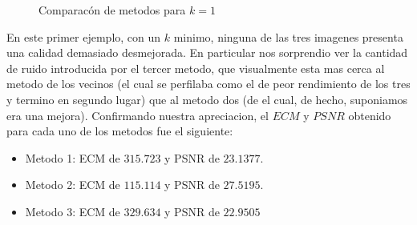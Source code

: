 \begin{figure}[H]
    \centering
    \qquad
    \qquad
    \caption{Comparacón de metodos para $k = 1$}
    \label{fig:example}
\end{figure}

En este primer ejemplo, con un $k$ minimo, ninguna de las tres imagenes presenta una calidad demasiado desmejorada. En particular nos sorprendio ver la cantidad de ruido introducida por el tercer metodo, que visualmente esta mas cerca al metodo de los vecinos (el cual se perfilaba como el de peor rendimiento de los tres y termino en segundo lugar) que al metodo dos (de el cual, de hecho, suponiamos era una mejora).
Confirmando nuestra apreciacion, el $ECM$ y $PSNR$ obtenido para cada uno de los metodos fue el siguiente:
\begin{itemize}
 \item Metodo 1: ECM de $315.723$ y PSNR de $23.1377$.
 \item Metodo 2: ECM de $115.114$ y PSNR de $27.5195$.
 \item Metodo 3: ECM de $329.634$ y PSNR de $22.9505$
\end{itemize}


